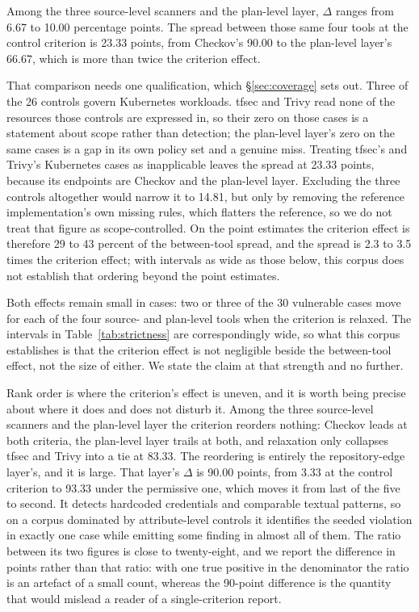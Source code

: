 \documentclass[smallextended]{svjour3}
\begin{document}
Among the three source-level scanners and the plan-level layer, $\Delta$ ranges
from 6.67 to 10.00 percentage points. The spread between those same four tools at
the control criterion is 23.33 points, from Checkov's 90.00 to the plan-level
layer's 66.67, which is more than twice the criterion effect.

That comparison needs one qualification, which \S\ref{sec:coverage} sets out.
Three of the 26 controls govern Kubernetes workloads. tfsec and Trivy read none of
the resources those controls are expressed in, so their zero on those cases is a
statement about scope rather than detection; the plan-level layer's zero on the
same cases is a gap in its own policy set and a genuine miss. Treating tfsec's
and Trivy's Kubernetes cases as inapplicable leaves the spread at 23.33 points,
because its endpoints are Checkov and the plan-level layer. Excluding the three
controls altogether would narrow it to 14.81, but only by removing the reference
implementation's own missing rules, which flatters the reference, so we do not
treat that figure as scope-controlled. On the point estimates the criterion effect
is therefore 29 to 43 percent of the between-tool spread, and the spread is 2.3
to 3.5 times the criterion effect; with intervals as wide as those below, this corpus
does not establish that ordering beyond the point estimates.

Both effects remain small in cases: two or three of the 30 vulnerable cases move
for each of the four source- and plan-level tools when the criterion is relaxed. The intervals in
Table~\ref{tab:strictness} are correspondingly wide, so what this corpus
establishes is that the criterion effect is not negligible beside the
between-tool effect, not the size of either. We state the claim at that strength
and no further.

Rank order is where the criterion's effect is uneven, and it is worth being
precise about where it does and does not disturb it. Among the three source-level scanners and the
plan-level layer the criterion reorders nothing: Checkov leads at both criteria,
the plan-level layer trails at both, and relaxation only collapses tfsec and
Trivy into a tie at 83.33. The
reordering is entirely the repository-edge layer's, and it is large. That layer's
$\Delta$ is 90.00 points, from 3.33 at the control criterion to 93.33 under the
permissive one, which moves it from last of the five to second. It detects
hardcoded credentials and comparable textual patterns, so on a corpus dominated
by attribute-level controls it identifies the seeded violation in exactly one
case while emitting some finding in almost all of them. The ratio between its two
figures is close to twenty-eight, and we report the difference in points rather
than that ratio: with one true positive in the denominator the ratio is an
artefact of a small count, whereas the 90-point difference is the quantity that
would mislead a reader of a single-criterion report.
\end{document}
